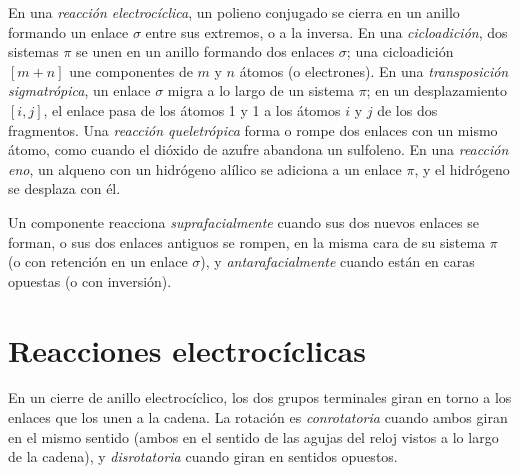 \begin{definition}\label{def:b3:pericyclic:families}
En una \emph{reacción electrocíclica}, un polieno
conjugado se cierra en un anillo formando un enlace $\sigma$ entre sus extremos, o a la
inversa. En una \emph{cicloadición}, dos sistemas $\pi$ se unen
en un anillo formando dos enlaces $\sigma$; una cicloadición $[m + n]$ une componentes
de $m$ y $n$ átomos (o electrones). En una \emph{transposición
sigmatrópica}, un enlace $\sigma$ migra a lo largo de un sistema
$\pi$; en un desplazamiento $[i, j]$, el enlace pasa de los átomos 1 y 1 a los átomos $i$ y $j$
de los dos fragmentos. Una \emph{reacción queletrópica}
forma o rompe dos enlaces con un mismo átomo, como cuando el dióxido de azufre
abandona un sulfoleno. En una \emph{reacción eno}, un alqueno
con un hidrógeno alílico se adiciona a un enlace $\pi$, y el hidrógeno se desplaza con él.
\end{definition}

\begin{definition}\label{def:b3:pericyclic:faciality}
Un componente reacciona \emph{suprafacialmente} cuando sus dos nuevos
enlaces se forman, o sus dos enlaces antiguos se rompen, en la misma cara de su sistema $\pi$ (o con
retención en un enlace $\sigma$), y \emph{antarafacialmente} cuando
están en caras opuestas (o con inversión).
\end{definition}

\section{Reacciones electrocíclicas}

\begin{definition}\label{def:b3:pericyclic:rotation-modes}
En un cierre de anillo electrocíclico, los dos grupos terminales giran en torno a los enlaces
que los unen a la cadena. La rotación es \emph{conrotatoria}
cuando ambos giran en el mismo sentido (ambos en el sentido de las agujas del reloj vistos a lo largo de la cadena), y
\emph{disrotatoria} cuando giran en sentidos opuestos.
\end{definition}

